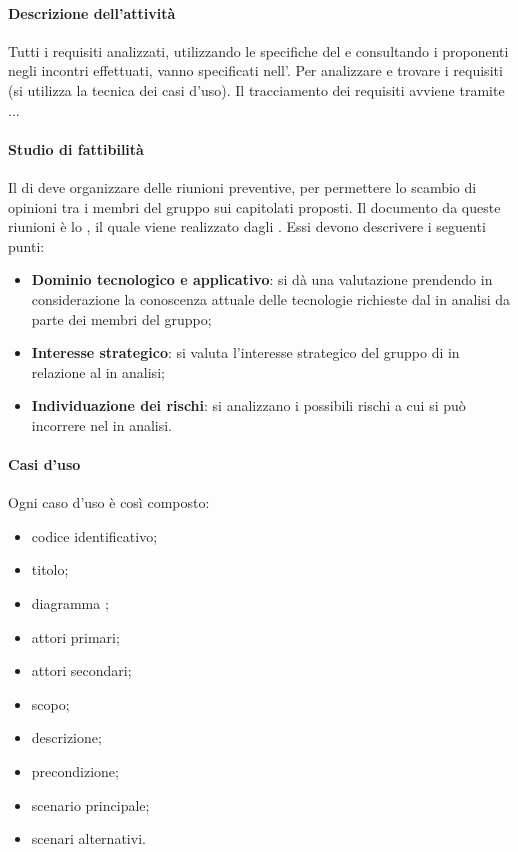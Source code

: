  \paragraph{Descrizione dell'attività}
 Tutti i requisiti analizzati, utilizzando le specifiche del  e consultando i proponenti negli
incontri effettuati, vanno specificati nell'\ARdocRR. Per analizzare e trovare i
requisiti (si utilizza la tecnica dei casi d'uso). Il tracciamento dei requisiti avviene tramite ... 
 \paragraph{Studio di fattibilità}
 Il \RESP{} di  deve organizzare delle riunioni preventive, per permettere lo scambio
di opinioni tra i membri del gruppo sui capitolati proposti. Il documento  da queste
riunioni è lo \SFdocRR , il quale viene realizzato dagli \ANP{}. Essi devono
descrivere i seguenti punti: 
\begin{itemize}
 \item \textbf{Dominio tecnologico e applicativo}: si dà una valutazione prendendo in   considerazione
 la conoscenza attuale delle tecnologie richieste dal  in analisi da parte dei membri  
del gruppo;
 \item \textbf{Interesse strategico}: si valuta l'interesse strategico del gruppo di  in relazione
al  in analisi;
 \item \textbf{Individuazione dei rischi}: si analizzano i possibili rischi a cui si può incorrere nel
 in analisi.
\end{itemize}
 \paragraph{Casi d'uso}
 Ogni caso d'uso è così composto:
 \begin{itemize}
  \item codice identificativo;
  \item titolo;
  \item diagramma ;
  \item attori primari;
  \item attori secondari;
  \item scopo;
  \item descrizione;
  \item precondizione;
  \item scenario principale;
  \item scenari alternativi.
 \end{itemize}
